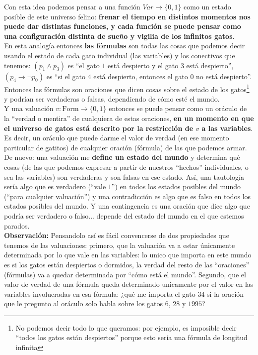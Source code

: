 \documentclass[10pt,a4paper]{article}
\newcommand{\ra}{\rightarrow}
\begin{document}
Con esta idea podemos pensar a una función $Var \ra \{0,1\}$ como un estado posible de este universo felino: \textbf{frenar el tiempo en distintos momentos nos puede dar distintas funciones, y cada función se puede pensar como una configuración distinta de sueño y vigilia de los infinitos gatos}.\\


En esta analogía entonces \textbf{las fórmulas} son todas las cosas que podemos decir usando el estado de cada gato individual (las variables) y los conectivos que tenemos: $(p_1 \land p_3)$ es ``el gato $1$ está despierto y el gato $3$ está despierto'', $(p_4 \ra \neg p_0)$ es ``si el gato $4$ está despierto, entonces el gato $0$ no está despierto''. Entonces las fórmulas son  oraciones que dicen cosas sobre el estado de los gatos\footnote{No podemos decir todo lo que queramos: por ejemplo, es imposible decir ``todos los gatos están despiertos'' porque esto sería una fórmula de longitud infinita} y podrían ser verdaderas o falsas, dependiendo de cómo esté el mundo. \\

Y una valuación $v : \text{Form} \ra \{ 0, 1 \}$ entonces se puede pensar como un oráculo de la ``verdad o mentira'' de cualquiera de estas oraciones, \textbf{en un momento en que el universo de gatos está descrito por la restricción de $v$ a las variables}. Es decir, un oráculo que puede darme el valor de verdad (en ese momento particular de gatitos) de cualquier oración (fórmula) de las que podemos armar. \\


De nuevo: una valuación me \textbf{define un estado del mundo} y determina qué cosas (de las que podemos expresar a partir de nuestros ``hechos'' individuales, o sea las variables) son verdaderas y son falsas en ese estado. Así, una tautología sería algo que es verdadero (``vale $1$'') en todos los estados posibles del mundo (``para cualquier valuación'') y una contradicción es algo que es falso en todos los estados posibles del mundo. Y una contingencia es una oración que dice algo que podría ser verdadero o falso... depende del estado del mundo en el que estemos parados. \\


\textbf{\textbf{Observación}:} Pensandolo así es fácil convencerse de dos propiedades que tenemos de las valuaciones: primero, que la valuación va a estar únicamente determinada por lo que vale en las variables: lo unico que importa en este mundo es si los gatos están despiertos o dormidos, la verdad del resto de las ``oraciones'' (fórmulas) va a quedar determinada por ``cómo está el mundo''. Segundo, que el valor de verdad de una fórmula queda determinado unicamente por el valor en las variables involucradas en esa fórmula: ¿qué me importa el gato $34$ si la oración que le pregunto al oráculo solo habla sobre los gatos $6$, $28$ y $1995$?
\end{document}
